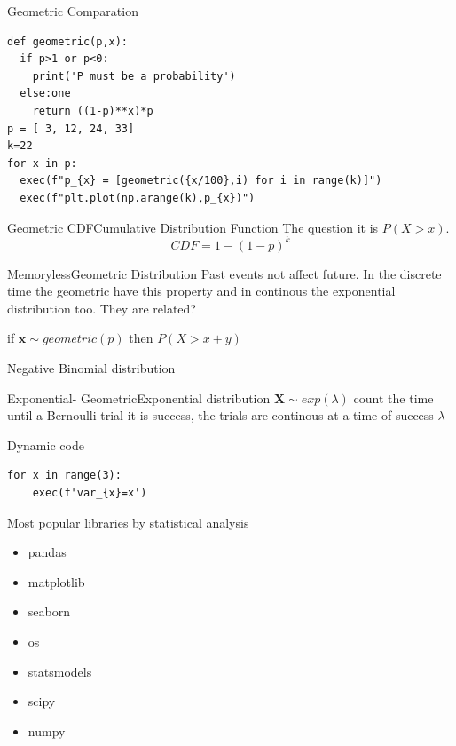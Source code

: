 \documentclass{beamer}
\begin{document}
\begin{frame}[fragile]{Geometric Comparation}
\begin{lstlisting}
def geometric(p,x):
  if p>1 or p<0:
    print('P must be a probability')
  else:one
    return ((1-p)**x)*p
p = [ 3, 12, 24, 33]
k=22
for x in p:
  exec(f"p_{x} = [geometric({x/100},i) for i in range(k)]")
  exec(f"plt.plot(np.arange(k),p_{x})")
\end{lstlisting}
\end{frame}






\begin{frame}{Geometric CDF}{Cumulative Distribution Function}
The question it is $P(X>x)$.
\begin{equation}
CDF = 1-(1-p)^{k}
\end{equation}
\end{frame}




\begin{frame}{Memoryless}{Geometric Distribution}
Past events not affect future.
In the discrete time the geometric have this property and in continous the exponential distribution too. They are related?
\begin{theorem}
if $\mathbf{x} \sim geometric(p)$ then $P(X>x+y)$
\end{theorem}
\end{frame}

\begin{frame}{Negative Binomial distribution}

\end{frame}

\begin{frame}{Exponential- Geometric}{Exponential distribution}
$\mathbf{X} \sim exp(\lambda)$  count the time until a Bernoulli trial it is success, the trials are continous at a time of success $\lambda$

\end{frame}






\begin{frame}[fragile]{Dynamic code}
\begin{lstlisting}
for x in range(3):
	exec(f'var_{x}=x')
\end{lstlisting}
\end{frame}



\begin{frame}{Most popular libraries by statistical analysis}
\begin{itemize}
\item pandas
\item matplotlib
\item seaborn
\item os
\item statsmodels
\item scipy
\item numpy
\end{itemize}
\end{frame}
\end{document}
